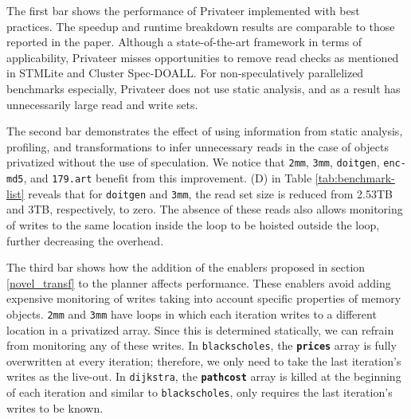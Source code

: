 The first bar shows the performance of Privateer implemented with best practices.
The speedup and runtime breakdown results are comparable to those reported
in the paper. Although a state-of-the-art framework in terms of applicability,
Privateer misses opportunities to remove read checks as mentioned in
STMLite\cite{mehrara:09:stmlite} and Cluster Spec-DOALL\cite{kim:12:cgo}.
For non-speculatively parallelized benchmarks especially, Privateer does not use
static analysis, and as a result has unnecessarily large read and write
sets.
%

The second bar demonstrates the effect of using information from static
analysis, profiling, and transformations to infer unnecessary reads in the
case of objects privatized without the use of speculation. We notice
that \texttt{2mm}, \texttt{3mm}, \texttt{doitgen}, \texttt{enc-md5}, and
\texttt{179.art} benefit from this improvement. (D) in Table
\ref{tab:benchmark-list} reveals that for \texttt{doitgen} and \texttt{3mm},
the read set size is reduced from 2.53TB and 3TB, respectively, to zero.
The absence of these reads also allows monitoring of writes to the same
location inside the loop to be hoisted outside the loop, further decreasing
the overhead.
%

The third bar shows how the addition of the enablers proposed in section
\ref{novel_transf} to the planner affects performance. These enablers
avoid adding expensive monitoring of writes taking into account specific
properties of memory objects. \texttt{2mm} and \texttt{3mm} have loops in
which each iteration writes to a different location in a privatized array.
Since this is determined statically, we can refrain from monitoring any of
these writes. In \texttt{blackscholes}, the \texttt{\textbf{prices}} array
is fully overwritten at every iteration; therefore, we only need to take
the last iteration's writes as the live-out. In \texttt{dijkstra},
the \texttt{\textbf{pathcost}} array is killed at the beginning of each
iteration and similar to \texttt{blackscholes}, only requires the last
iteration's writes to be known.

